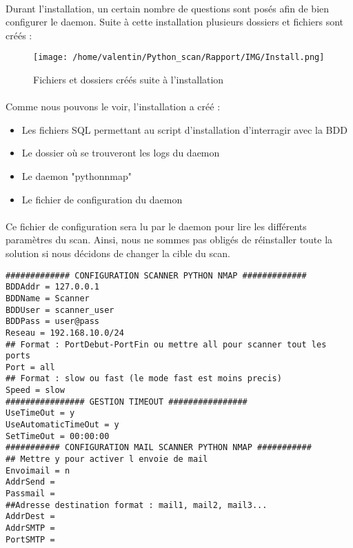 \documentclass[12pt]{report}
\begin{document}
		\paragraph{}
			Durant l'installation, un certain nombre de questions sont posés afin de bien configurer le daemon. Suite à cette installation plusieurs dossiers et fichiers sont créés :
			\begin{figure}[ht]
				\begin{center}\texttt{[image: /home/valentin/Python\_scan/Rapport/IMG/Install.png]}
				\caption{\label{create_file} Fichiers et dossiers créés suite à l'installation}\end{center}
			\end{figure}
		\paragraph{}
			Comme nous pouvons le voir, l'installation a créé :
			\begin{itemize}
				\item Les fichiers SQL permettant au script d'installation d'interragir avec la BDD
				\item Le dossier où se trouveront les logs du daemon
				\item Le daemon "pythonnmap"
				\item Le fichier de configuration du daemon
			\end{itemize}
		\paragraph{}
			Ce fichier de configuration sera lu par le daemon pour lire les différents paramètres du scan. Ainsi, nous ne sommes pas obligés de réinstaller toute la solution si nous décidons de changer la cible du scan.
			\begin{lstlisting}[caption=Exemple fichier de configuration, captionpos=b]
############# CONFIGURATION SCANNER PYTHON NMAP #############
BDDAddr = 127.0.0.1
BDDName = Scanner
BDDUser = scanner_user
BDDPass = user@pass
Reseau = 192.168.10.0/24
## Format : PortDebut-PortFin ou mettre all pour scanner tout les ports
Port = all
## Format : slow ou fast (le mode fast est moins precis)
Speed = slow
################ GESTION TIMEOUT ################
UseTimeOut = y
UseAutomaticTimeOut = y
SetTimeOut = 00:00:00
########### CONFIGURATION MAIL SCANNER PYTHON NMAP ###########
## Mettre y pour activer l envoie de mail
Envoimail = n
AddrSend = 
Passmail = 
##Adresse destination format : mail1, mail2, mail3...
AddrDest = 
AddrSMTP = 
PortSMTP =

			\end{lstlisting}
\end{document}
